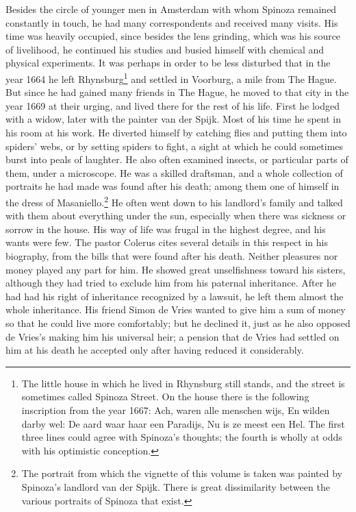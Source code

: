 \documentclass[12pt]{book}
\newcommand{\opage}[1]{\marginnote{\footnotesize\textit{[#1]}}}
\begin{document}
Besides the circle of younger men in Amsterdam with whom Spinoza remained constantly
in touch, he had many correspondents and received many visits. His time was heavily
occupied, since besides the lens grinding, which was his source of livelihood, he
continued his studies and busied himself with chemical and physical experiments. It
was perhaps in order to be less disturbed that in the year 1664 he left
Rhynsburg\footnote{The little house in which he lived in Rhynsburg still stands, and
the street is sometimes called Spinoza Street. On the house there is the following
inscription from the year 1667: Ach, waren alle menschen wijs, En wilden darby wel: De
aard waar haar een Paradijs, Nu is ze meest een Hel. The first three lines could agree
with Spinoza's thoughts; the fourth is wholly at odds with his optimistic conception.}
and settled in \opage{31}Voorburg, a mile from The Hague. But since he had gained many
friends in The Hague, he moved to that city in the year 1669 at their urging, and lived
there for the rest of his life. First he lodged with a widow, later with the painter
van der Spijk. Most of his time he spent in his room at his work. He diverted himself
by catching flies and putting them into spiders' webs, or by setting spiders to fight,
a sight at which he could sometimes burst into peals of laughter. He also often
examined insects, or particular parts of them, under a microscope. He was a skilled
draftsman, and a whole collection of portraits he had made was found after his death;
among them one of himself in the dress of Masaniello.\footnote{The portrait from which
the vignette of this volume is taken was painted by Spinoza's landlord van der Spijk.
There is great dissimilarity between the various portraits of Spinoza that exist.} He
often went down to his landlord's family and talked with them about everything under
the sun, especially when there was sickness or sorrow in the house. His way of life was
frugal in the highest degree, and his wants were few. The pastor Colerus cites several
details in this respect in his biography, from the bills that were found after his
death. Neither pleasures nor money played any part for him. He showed great
unselfishness toward his sisters, although they had tried to exclude him from his
paternal inheritance. After he had had his right of inheritance recognized by a
lawsuit, he left them \opage{32}almost the whole inheritance. His friend Simon de Vries wanted to give him a sum
of money so that he could live more comfortably; but he declined it, just as he also
opposed de Vries's making him his universal heir; a pension that de Vries had settled
on him at his death he accepted only after having reduced it considerably.
\end{document}
